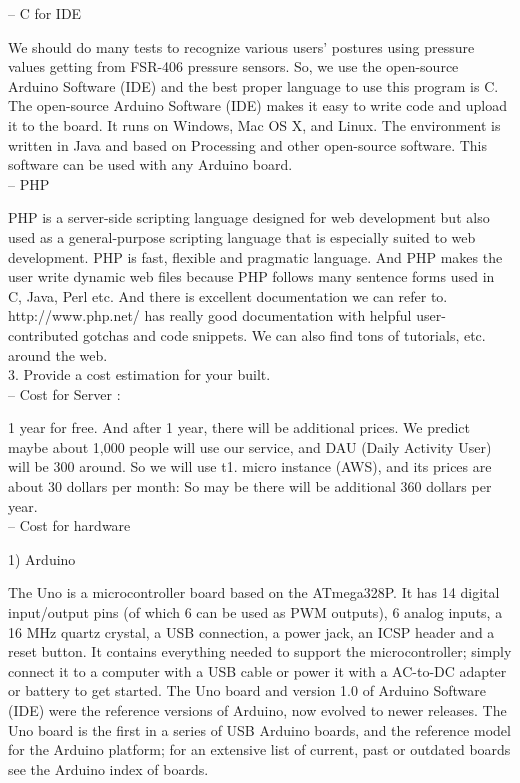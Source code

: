 \documentclass[conference]{IEEEtran}
\begin{document}
-- C for IDE

We should do many tests to recognize various users' postures using pressure values getting from FSR-406 pressure sensors. So, we use the open-source Arduino Software (IDE) and the best proper language to use this program is C. The open-source Arduino Software (IDE) makes it easy to write code and upload it to the board. It runs on Windows, Mac OS X, and Linux. The environment is written in Java and based on Processing and other open-source software. This software can be used with any Arduino board.\\

-- PHP

PHP is a server-side scripting language designed for web development but also used as a general-purpose scripting language that is especially suited to web development. PHP is fast, flexible and pragmatic language. And PHP makes the user write dynamic web files because PHP follows many sentence forms used in C, Java, Perl etc. And there is excellent documentation we can refer to. http://www.php.net/ has really good documentation with helpful user-contributed gotchas and code snippets. We can also find tons of tutorials, etc. around the web.\\

3.	Provide a cost estimation for your built.\\

-- Cost for Server :

1 year for free. And after 1 year, there will be additional prices. We predict maybe about 1,000 people will use our service, and DAU (Daily Activity User) will be 300 around. So we will use t1. micro instance (AWS), and its prices are about 30 dollars per month: So may be there will be additional 360 dollars per year.\\

-- Cost for hardware

1)	Arduino

The Uno is a microcontroller board based on the ATmega328P. It has 14 digital input/output pins (of which 6 can be used as PWM outputs), 6 analog inputs, a 16 MHz quartz crystal, a USB connection, a power jack, an ICSP header and a reset button. It contains everything needed to support the microcontroller; simply connect it to a computer with a USB cable or power it with a AC-to-DC adapter or battery to get started. The Uno board and version 1.0 of Arduino Software (IDE) were the reference versions of Arduino, now evolved to newer releases. The Uno board is the first in a series of USB Arduino boards, and the reference model for the Arduino platform; for an extensive list of current, past or outdated boards see the Arduino index of boards.\\
\end{document}
